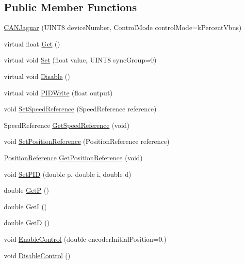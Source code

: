 \subsection*{\-Public \-Member \-Functions}
\begin{DoxyCompactItemize}
\item 
\hyperlink{classCANJaguar_a340969dc13d677bc2d5e35aa7f7b5138}{\-C\-A\-N\-Jaguar} (\-U\-I\-N\-T8 device\-Number, \-Control\-Mode control\-Mode=k\-Percent\-Vbus)
\item 
virtual float \hyperlink{classCANJaguar_a35f28a93acc83bcc482d481037389433}{\-Get} ()
\item 
virtual void \hyperlink{classCANJaguar_aa8a4f32b3c1839557cd73996693a116a}{\-Set} (float value, \-U\-I\-N\-T8 sync\-Group=0)
\item 
virtual void \hyperlink{classCANJaguar_a3dc0852859fb60499b609938b69e9252}{\-Disable} ()
\item 
virtual void \hyperlink{classCANJaguar_a2355d55f42083ab82870c79f742620e4}{\-P\-I\-D\-Write} (float output)
\item 
void \hyperlink{classCANJaguar_a581f44af48079151da32f6399e196c33}{\-Set\-Speed\-Reference} (\-Speed\-Reference reference)
\item 
\-Speed\-Reference \hyperlink{classCANJaguar_a453860ca7356cb42aa21958cbff30b82}{\-Get\-Speed\-Reference} (void)
\item 
void \hyperlink{classCANJaguar_ae99bbad1a99dcdd8f4620e4cc99705bf}{\-Set\-Position\-Reference} (\-Position\-Reference reference)
\item 
\-Position\-Reference \hyperlink{classCANJaguar_a3d73ad5f40fe5a471190263ccb5b5c97}{\-Get\-Position\-Reference} (void)
\item 
void \hyperlink{classCANJaguar_ae6650f4f7aea62f9df00056076b3d462}{\-Set\-P\-I\-D} (double p, double i, double d)
\item 
double \hyperlink{classCANJaguar_aba0dd36ac9faff31d16f78490edbe85d}{\-Get\-P} ()
\item 
double \hyperlink{classCANJaguar_affd66787becba69c8f9e5ffcb11f7ba1}{\-Get\-I} ()
\item 
double \hyperlink{classCANJaguar_ab8ddc893fde5f16e0c76684593c20758}{\-Get\-D} ()
\item 
void \hyperlink{classCANJaguar_af25bed87c7d97429b0472b52f92b186e}{\-Enable\-Control} (double encoder\-Initial\-Position=0.)
\item 
void \hyperlink{classCANJaguar_a6bbbf784a74cf95f7b4a5660a3d53cc2}{\-Disable\-Control} ()
\item 

\end{DoxyCompactItemize}
